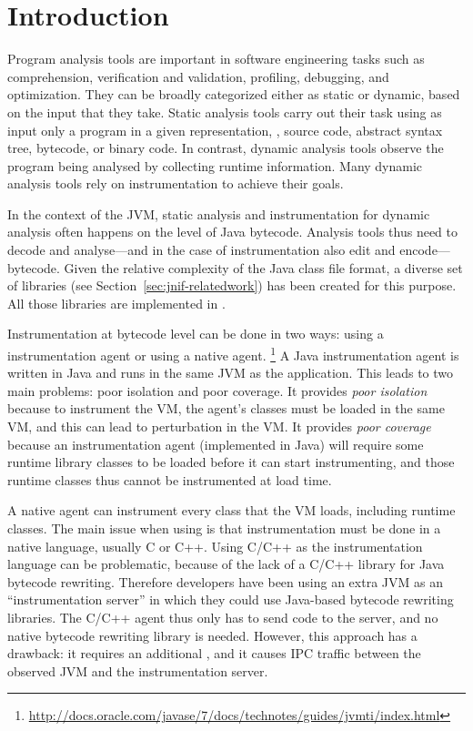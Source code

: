 \section{Introduction}\label{sec:jnif-introduction}

Program analysis tools are important in software engineering tasks 
such as comprehension, verification and validation, profiling, debugging, and optimization.
They can be broadly categorized either as static or dynamic,
based on the input that they take.
Static analysis tools carry out their task using as input only a program
in a given representation, \eg{}, source code, abstract syntax tree,
bytecode, or binary code.
In contrast, dynamic analysis tools observe the program being analysed 
by collecting runtime information.
Many dynamic analysis tools rely on instrumentation to achieve their goals.

In the context of the JVM, 
static analysis and instrumentation for dynamic analysis often happens on the level of Java bytecode.
Analysis tools thus need to decode and analyse---and in the case of instrumentation also edit and encode---\java{} bytecode.
Given the relative complexity of the Java class file format,
a diverse set of libraries (see Section~\ref{sec:jnif-relatedwork}) has been created for this purpose.
All those libraries are implemented in \java{}.

Instrumentation at bytecode level can be done in two ways:
using a \java{} instrumentation agent or using a native \jvmti{} agent.%
\footnote{\url{http://docs.oracle.com/javase/7/docs/technotes/guides/jvmti/index.html}}
A Java instrumentation agent is written in Java and runs in the same JVM as the application.
This leads to two main problems: poor isolation and poor coverage.
It provides \emph{poor isolation} because to instrument the VM, 
the agent's classes must be loaded in the same VM,
and this can lead to perturbation in the VM.
It provides \emph{poor coverage} because 
an instrumentation agent (implemented in Java) will require some runtime library classes to be loaded before it can start instrumenting,
and those runtime classes thus cannot be instrumented at load time. 

A native \jvmti{} agent can instrument every class that the VM loads, including runtime classes. 
The main issue when using \jvmti{} is that instrumentation must be done in a native language, usually C or C++. 
Using C/C++ as the instrumentation language can be problematic, 
because of the lack of a C/C++ library for Java bytecode rewriting. 
Therefore developers have been using an extra JVM as an ``instrumentation server''
in which they could use Java-based bytecode rewriting libraries.
The C/C++ \jvmti{} agent thus only has to send code to the server,
and no native bytecode rewriting library is needed.
However, this approach has a drawback: it requires an additional \jvm{}, 
and it causes IPC traffic between the observed JVM and the instrumentation server.

